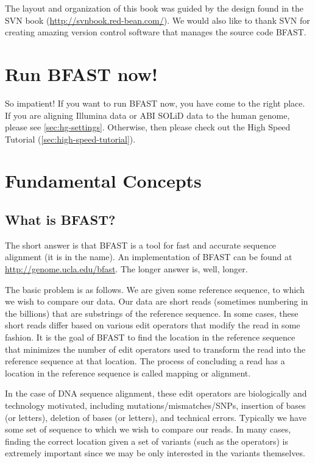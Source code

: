 \documentclass[a4paper,12pt]{book}
\begin{document}
The layout and organization of this book was guided by the design found in the SVN book (\url{http://svnbook.red-bean.com/}).
We would also like to thank SVN for creating amazing version control software that manages the source code BFAST.
\mainmatter

\chapter{Run BFAST now!}
So impatient!
If you want to run BFAST now, you have come to the right place.
If you are aligning Illumina data or ABI SOLiD data to the human genome, please see \autoref{sec:hg-settings}.  
Otherwise, then please check out the High Speed Tutorial (\autoref{sec:high-speed-tutorial}).

\chapter{Fundamental Concepts}
\section{What is BFAST?}
The short answer is that BFAST is a tool for fast and accurate sequence alignment (it is in the name).
An implementation of BFAST can be found at \url{http://genome.ucla.edu/bfast}.
The longer answer is, well, longer.

The basic problem is as follows.
We are given some reference sequence, to which we wish to compare our data.
Our data are short reads (sometimes numbering in the billions) that are substrings of the reference sequence.
In some cases, these short reads differ based on various edit operators that modify the read in some fashion.
It is the goal of BFAST to find the location in the reference sequence that minimizes the number of edit operators used to transform the read into the reference sequence at that location.
The process of concluding a read has a location in the reference sequence is called mapping or alignment.

In the case of DNA sequence alignment, these edit operators are biologically and technology motivated, including mutations/mismatches/SNPs, insertion of bases (or letters), deletion of bases (or letters), and technical errors. 
Typically we have some set of sequence to which we wish to compare our reads.
In many cases, finding the correct location given a set of variants (such as the operators) is extremely important since we may be only interested in the variants themselves.
\end{document}
